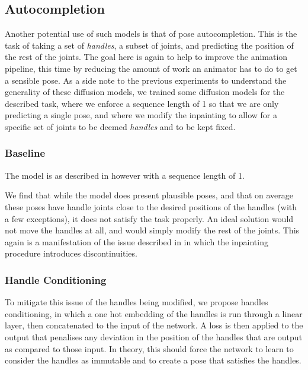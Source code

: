 
\subsection{Autocompletion}
\label{sec:autocomplete}

Another potential use of such models is that of pose autocompletion. This is the task of taking a set of \textit{handles}, a subset of joints, and predicting the position of the rest of the joints. The goal here is again to help to improve the animation pipeline, this time by reducing the amount of work an animator has to do to get a sensible pose. As a side note to the previous experiments to understand the generality of these diffusion models, we trained some diffusion models for the described task, where we enforce a sequence length of 1 so that we are only predicting a single pose, and where we modify the inpainting to allow for a specific set of joints to be deemed \textit{handles} and to be kept fixed.

\subsubsection{Baseline}
The model is as described in  however with a sequence length of 1.

We find that while the model does present plausible poses, and that on average these poses have handle joints close to the desired positions of the handles (with a few exceptions), it does not satisfy the task properly.  An ideal solution would not move the handles at all, and would simply modify the rest of the joints. This again is a manifestation of the issue described in  in which the inpainting procedure introduces discontinuities.

\subsubsection{Handle Conditioning}
To mitigate this issue of the handles being modified, we propose handles conditioning, in which a one hot embedding of the handles is run through a linear layer, then concatenated to the input of the network. A loss is then applied to the output that penalises any deviation in the position of the handles that are output as compared to those input. In theory, this should force the network to learn to consider the handles as immutable and to create a pose that satisfies the handles.

